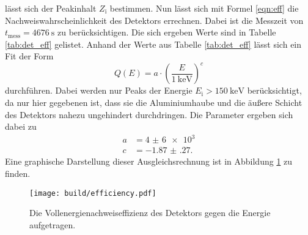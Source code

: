 lässt sich der Peakinhalt $Z_\text{i}$ bestimmen. Nun lässt sich mit Formel \ref{eqn:eff}
die Nachweiswahrscheinlichkeit des Detektors errechnen. Dabei ist die Messzeit von $t_\text{mess} = \SI{4676}{\second}$
zu berücksichtigen. Die sich ergeben Werte sind in Tabelle \ref{tab:det_eff} gelistet.
Anhand der Werte aus Tabelle \ref{tab:det_eff} lässt sich ein Fit der Form
\begin{equation}
  \label{eqn:Potenz}
  Q(E) = a \cdot \left(\frac{E}{\SI{1}{\kilo\electronvolt}}\right)^c
\end{equation}
durchführen. Dabei werden nur Peaks der Energie $E_\text{i} > \SI{150}{\kilo\electronvolt}$ berücksichtigt,
da nur hier gegebenen ist, dass sie die Aluminiumhaube und die äußere Schicht des Detektors nahezu
ungehindert durchdringen. Die Parameter ergeben sich dabei zu
\begin{align*}
  a &= \num{4(6)e3} \\
  c &= \num{-1.87(27)}.
\end{align*}
Eine graphische Darstellung dieser Ausgleichsrechnung ist in Abbildung \ref{fig:effizenz} zu finden.

\begin{figure}[htb]
 \centering
 \texttt{[image: build/efficiency.pdf]}
 \caption{Die Vollenergienachweiseffizienz des Detektors gegen die Energie aufgetragen.}
 \label{fig:effizenz}
\end{figure}

\FloatBarrier



